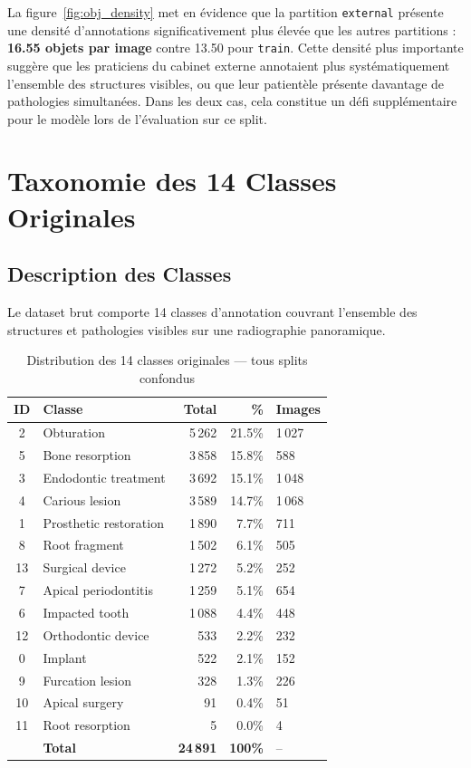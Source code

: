 \documentclass{rapportENSIAS}
\begin{document}
La figure~\ref{fig:obj_density} met en évidence que la partition \texttt{external}
présente une densité d'annotations significativement plus élevée que les autres
partitions : \textbf{16.55 objets par image} contre 13.50 pour \texttt{train}.
Cette densité plus importante suggère que les praticiens du cabinet externe
annotaient plus systématiquement l'ensemble des structures visibles, ou que
leur patientèle présente davantage de pathologies simultanées. Dans les deux cas,
cela constitue un défi supplémentaire pour le modèle lors de l'évaluation sur ce split.

\section{Taxonomie des 14 Classes Originales}

\subsection{Description des Classes}

Le dataset brut comporte 14 classes d'annotation couvrant l'ensemble des
structures et pathologies visibles sur une radiographie panoramique.

\begin{table}[H]
\centering
\caption{Distribution des 14 classes originales — tous splits confondus}
\label{tab:14_classes_distribution}
\begin{tabular}{clrrl}
\toprule
\textbf{ID} & \textbf{Classe} & \textbf{Total} & \textbf{\%} & \textbf{Images} \\
\midrule
2  & Obturation              & 5\,262 & 21.5\% & 1\,027 \\
5  & Bone resorption         & 3\,858 & 15.8\% & 588    \\
3  & Endodontic treatment    & 3\,692 & 15.1\% & 1\,048 \\
4  & Carious lesion          & 3\,589 & 14.7\% & 1\,068 \\
1  & Prosthetic restoration  & 1\,890 & 7.7\%  & 711    \\
8  & Root fragment           & 1\,502 & 6.1\%  & 505    \\
13 & Surgical device         & 1\,272 & 5.2\%  & 252    \\
7  & Apical periodontitis    & 1\,259 & 5.1\%  & 654    \\
6  & Impacted tooth          & 1\,088 & 4.4\%  & 448    \\
12 & Orthodontic device      & 533    & 2.2\%  & 232    \\
0  & Implant                 & 522    & 2.1\%  & 152    \\
9  & Furcation lesion        & 328    & 1.3\%  & 226    \\
10 & Apical surgery          & 91     & 0.4\%  & 51     \\
11 & Root resorption         & 5      & 0.0\%  & 4      \\
\midrule
   & \textbf{Total}          & \textbf{24\,891} & \textbf{100\%} & -- \\
\bottomrule
\end{tabular}
\end{table}
\end{document}
